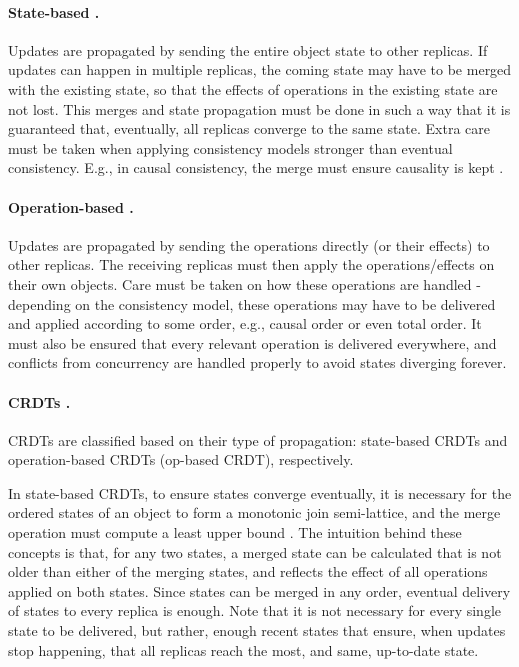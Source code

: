 \paragraph{State-based \cite{crdt}.} Updates are propagated by sending the entire object state to other replicas.
If updates can happen in multiple replicas, the coming state may have to be merged with the existing state, so that the effects of operations in the existing state are not lost.
This merges and state propagation must be done in such a way that it is guaranteed that, eventually, all replicas converge to the same state.
Extra care must be taken when applying consistency models stronger than eventual consistency.
E.g., in causal consistency, the merge must ensure causality is kept \cite{understandingEC}.

\paragraph{Operation-based \cite{crdt}.}
Updates are propagated by sending the operations directly (or their effects) to other replicas.
The receiving replicas must then apply the operations/effects on their own objects.
Care must be taken on how these operations are handled - depending on the consistency model, these operations may have to be delivered and applied according to some order, e.g., causal order or even total order.
It must also be ensured that every relevant operation is delivered everywhere, and conflicts from concurrency are handled properly to avoid states diverging forever.

\paragraph{CRDTs \cite{crdt}.}
CRDTs are classified based on their type of propagation: state-based CRDTs and operation-based CRDTs (op-based CRDT), respectively.

In state-based CRDTs, to ensure states converge eventually, it is necessary for the ordered states of an object to form a monotonic join semi-lattice, and the merge operation must compute a least upper bound \cite{crdt, stateCRDT}. The intuition behind these concepts is that, for any two states, a merged state can be calculated that is not older than either of the merging states, and reflects the effect of all operations applied on both states.
Since states can be merged in any order, eventual delivery of states to every replica is enough.
Note that it is not necessary for every single state to be delivered, but rather, enough recent states that ensure, when updates stop happening, that all replicas reach the most, and same, up-to-date state.

